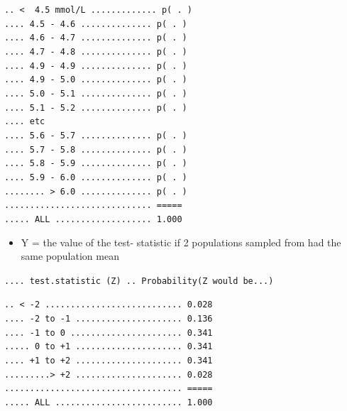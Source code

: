 \documentclass[]{book}
\providecommand{\tightlist}{%
  \setlength{\itemsep}{0pt}\setlength{\parskip}{0pt}}
\begin{document}
\texttt{..\ \textless{}\ \ 4.5\ mmol/L\ .............\ p(\ .\ )}\\
\texttt{....\ 4.5\ -\ 4.6\ ..............\ p(\ .\ )}~\\
\texttt{....\ 4.6\ -\ 4.7\ ..............\ p(\ .\ )}~\\
\texttt{....\ 4.7\ -\ 4.8\ ..............\ p(\ .\ )}~\\
\texttt{....\ 4.9\ -\ 4.9\ ..............\ p(\ .\ )}~\\
\texttt{....\ 4.9\ -\ 5.0\ ..............\ p(\ .\ )}~\\
\texttt{....\ 5.0\ -\ 5.1\ ..............\ p(\ .\ )}~\\
\texttt{....\ 5.1\ -\ 5.2\ ..............\ p(\ .\ )}~\\
\texttt{....\ etc}~\\
\texttt{....\ 5.6\ -\ 5.7\ ..............\ p(\ .\ )}~\\
\texttt{....\ 5.7\ -\ 5.8\ ..............\ p(\ .\ )}~\\
\texttt{....\ 5.8\ -\ 5.9\ ..............\ p(\ .\ )}~\\
\texttt{....\ 5.9\ -\ 6.0\ ..............\ p(\ .\ )}~\\
\texttt{........\ \textgreater{}\ 6.0\ ..............\ p(\ .\ )}~\\
\texttt{.............................\ =====}~\\
\texttt{.....\ ALL\ ...................\ 1.000}

\begin{itemize}
\tightlist
\item
  Y = the value of the test- statistic if 2 populations sampled from had the same population mean
\end{itemize}

\texttt{....\ test.statistic\ (Z)\ ..\ Probability(Z\ would\ be...)}

\texttt{..\ \textless{}\ -2\ ...........................\ 0.028}\\
\texttt{....\ -2\ to\ -1\ .....................\ 0.136}~\\
\texttt{....\ -1\ to\ 0\ ......................\ 0.341}~\\
\texttt{.....\ 0\ to\ +1\ .....................\ 0.341}~\\
\texttt{....\ +1\ to\ +2\ .....................\ 0.341}~\\
\texttt{.........\textgreater{}\ +2\ .....................\ 0.028}~\\
\texttt{...................................\ =====}~\\
\texttt{.....\ ALL\ .........................\ 1.000}
\end{document}
